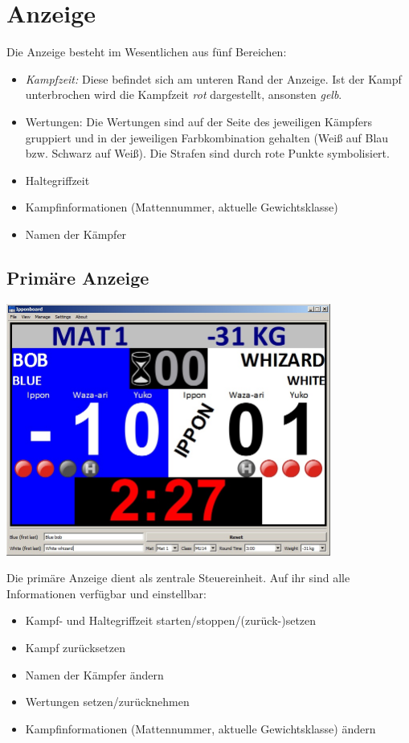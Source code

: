 \documentclass[ngerman,12pt,numbers=noenddot]{scrreprt}
\begin{document}
{\section{Anzeige}
Die Anzeige besteht im Wesentlichen aus f\"unf Bereichen:
\begin{itemize}
	\item \textit{Kampfzeit:} Diese befindet sich am unteren Rand der Anzeige. Ist der Kampf unterbrochen wird die Kampfzeit \textit{rot} dargestellt, ansonsten \textit{gelb}.
	\item Wertungen: Die Wertungen sind auf der Seite des jeweiligen K\"ampfers gruppiert und in der jeweiligen Farbkombination gehalten (Wei{\ss} auf Blau bzw. Schwarz auf Wei{\ss}). Die Strafen sind durch rote Punkte symbolisiert.
	\item Haltegriffzeit
	\item Kampfinformationen (Mattennummer, aktuelle Gewichtsklasse)
	\item Namen der K\"ampfer
\end{itemize}

\subsection[Prim\"are Anzeige]{Prim\"are Anzeige}
\begin{center}
\includegraphics[width=0.8\textwidth]{Anleitung-img001.jpg}
\end{center}
Die prim\"are Anzeige dient als zentrale Steuereinheit. Auf ihr sind alle Informationen verf\"ugbar und einstellbar:
\begin{itemize}
	\item Kampf- und Haltegriffzeit starten/stoppen/(zur\"uck-)setzen
	\item Kampf zur\"ucksetzen
	\item Namen der K\"ampfer \"andern
	\item Wertungen setzen/zur\"ucknehmen
	\item Kampfinformationen (Mattennummer, aktuelle Gewichtsklasse) \"andern
\end{itemize}

}
\end{document}
